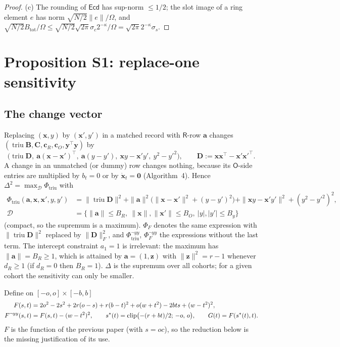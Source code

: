 \documentclass[11pt]{article}
\theoremstyle{definition}
\theoremstyle{plain}
\newcommand{\Rp}{\mathsf{R}}
\newcommand{\Op}{\mathsf{O}}
\newcommand{\Ecd}{\mathsf{Ecd}}
\newcommand{\bB}{\mathbf{B}}
\newcommand{\bC}{\mathbf{C}}
\newcommand{\bc}{\mathbf{c}}
\newcommand{\by}{\mathbf{y}}
\newcommand{\bx}{\mathbf{x}}
\newcommand{\bxd}{\dot{\mathbf{x}}}
\DeclareMathOperator{\triu}{triu}
\newcommand{\bD}{\mathbf{D}}
\newcommand{\ba}{\mathbf{a}}
\newcommand{\bz}{\mathbf{z}}
\DeclareMathOperator{\clip}{clip}
\begin{document}
\begin{proof}
(c) The rounding of $\Ecd$ has sup-norm $\le1/2$; the slot image of a ring element $e$ has norm $\sqrt{N/2}\|e\|/\Omega$, and $\sqrt{N/2}B_{\mathrm{tot}}/\Omega\le\sqrt{N/2}\sqrt{2\pi}\sigma_c2^{-\kappa}/\Omega=\sqrt{2\pi}2^{-\kappa}\sigma_s$.
\end{proof}

\section{Proposition S1: replace-one sensitivity}
\label{sec:S1}

\subsection{The change vector}
Replacing $(\bx,y)$ by $(\bx',y')$ in a matched record with $\Rp$-row $\ba$ changes $(\triu\bB,\bC,\bc_R,\bc_O,\by^\top\by)$ by
\[
  \bigl(\triu\bD,\ \ba(\bx-\bx')^\top,\ \ba(y-y'),\ \bx y-\bx'y',\ y^2-y'^2\bigr),\qquad \bD:=\bx\bx^\top-\bx'\bx'^\top .
\]
A change in an unmatched (or dummy) row changes nothing, because its $\Op$-side entries are multiplied by $b_t=0$ or by $\bxd_t=\mathbf0$ (Algorithm~4). Hence $\Delta^2=\max_{\mathcal D}\Phi_{\triu}$ with
\begin{align*}
  \Phi_{\triu}(\ba,\bx,\bx',y,y')&=\|\triu\bD\|^2+\|\ba\|^2\bigl(\|\bx-\bx'\|^2+(y-y')^2\bigr)+\|\bx y-\bx'y'\|^2+(y^2-y'^2)^2,\\
  \mathcal D&=\{\|\ba\|\le B_R,\ \|\bx\|,\|\bx'\|\le B_O,\ |y|,|y'|\le B_y\}
\end{align*}
(compact, so the supremum is a maximum). $\Phi_F$ denotes the same expression with $\|\triu\bD\|^2$ replaced by $\|\bD\|_F^2$, and $\Phi_{\triu}^{\neg yy}$, $\Phi_F^{\neg yy}$ the expressions without the last term. The intercept constraint $a_1=1$ is irrelevant: the maximum has $\|\ba\|=B_R\ge1$, which is attained by $\ba=(1,\bz)$ with $\|\bz\|^2=r-1$ whenever $d_R\ge1$ (if $d_R=0$ then $B_R=1$). $\Delta$ is the supremum over all cohorts; for a given cohort the sensitivity can only be smaller.

Define on $[-o,o]\times[-b,b]$
\begin{align}
  F(s,t)&=2o^2-2s^2+2r(o-s)+r(b-t)^2+o(w+t^2)-2bts+(w-t^2)^2, \label{eq:F}\\
  F^{\neg yy}(s,t)&=F(s,t)-(w-t^2)^2,\qquad s^*(t)=\clip\bigl(-(r+bt)/2;\,-o,\,o\bigr),\qquad G(t)=F(s^*(t),t). \notag
\end{align}
$F$ is the function of the previous paper (with $s=oc$), so the reduction below is the missing justification of its use.
\end{document}
